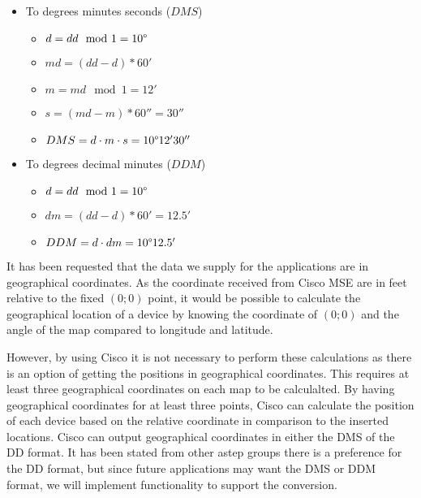 \begin{itemize}
\begin{itemize}
		\item To degrees minutes seconds ($DMS$)
		\begin{itemize}
			\setlength\itemsep{0.00005em}
			\item $ d = dd \mod 1 = 10\degree $
			\item $ md = (dd - d) * 60' $
			\item $ m = md \mod 1 = 12' $
			\item $ s = (md - m) * 60'' = 30''$
			\item $ DMS = d \cdot m \cdot s = 10\degree 12' 30''$ 
		\end{itemize}
		\item To degrees decimal minutes ($DDM$)
		\begin{itemize}
			\setlength\itemsep{0.00005em}
			\item $ d = dd \mod 1 = 10\degree $
			\item $ dm = (dd - d) * 60' = 12.5' $
			\item $ DDM = d \cdot dm = 10\degree 12.5'$
		\end{itemize}
	\end{itemize}
\end{itemize}

It has been requested that the data we supply for the applications are in geographical coordinates.
As the coordinate received from Cisco MSE are in feet relative to the fixed $(0;0)$ point, it would be possible to calculate the geographical location of a device by knowing the coordinate of $(0;0)$ and the angle of the map compared to longitude and latitude. 

However, by using Cisco it is not necessary to perform these calculations as there is an option of getting the positions in geographical coordinates. This requires at least three geographical coordinates on each map to be calculalted. By having geographical coordinates for at least three points, Cisco can calculate the position of each device based on the relative coordinate in comparison to the inserted locations\cite{geo_cisco}. 
Cisco can output geographical coordinates in either the DMS of the DD format\cite{cisco_geo_type}. It has been stated from other astep groups there is a preference for the DD format, but since future applications may want the DMS or DDM format, we will implement functionality to support the conversion. 


